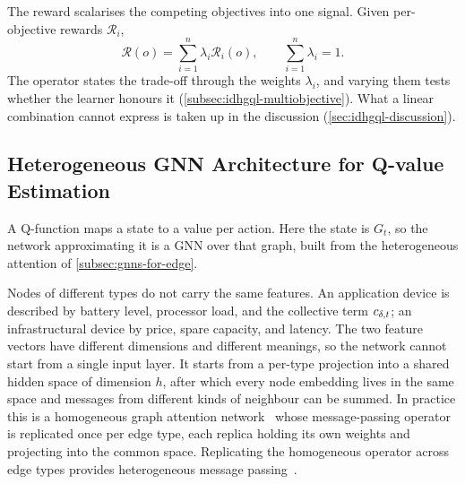 The reward scalarises the competing objectives into one signal.
%
Given per-objective rewards $\mathcal{R}_i$,
\[
    \mathcal{R}(o) = \sum_{i=1}^{n} \lambda_i \mathcal{R}_i(o),
    \qquad \sum_{i=1}^{n} \lambda_i = 1 .
\]
The operator states the trade-off through the weights $\lambda_i$,
and varying them tests whether the learner honours it (\cref{subsec:idhgql-multiobjective}).
%
What a linear combination cannot express is taken up in the discussion (\cref{sec:idhgql-discussion}).

\subsection{Heterogeneous GNN Architecture for Q-value Estimation}
\label{subsec:heterognn-q-function}

A Q-function maps a state to a value per action.
%
Here the state is $G_t$,
so the network approximating it is a \ac{GNN} over that graph,
built from the heterogeneous attention of \cref{subsec:gnns-for-edge}.

Nodes of different types do not carry the same features.
%
An application device is described by battery level, processor load, and the collective term $c_{\delta,t}$;
an infrastructural device by price, spare capacity, and latency.
%
The two feature vectors have different dimensions and different meanings,
so the network cannot start from a single input layer.
%
It starts from a per-type projection into a shared hidden space of dimension $h$,
after which every node embedding lives in the same space and messages from different kinds of neighbour can be summed.
%
In practice this is a homogeneous graph attention network~\cite{DBLP:conf/iclr/VelickovicCCRLB18}
whose message-passing operator is replicated once per edge type,
each replica holding its own weights and projecting into the common space.
%
Replicating the homogeneous operator across edge types provides heterogeneous message passing~\cite{DBLP:conf/www/WangJSWCYY19}.

